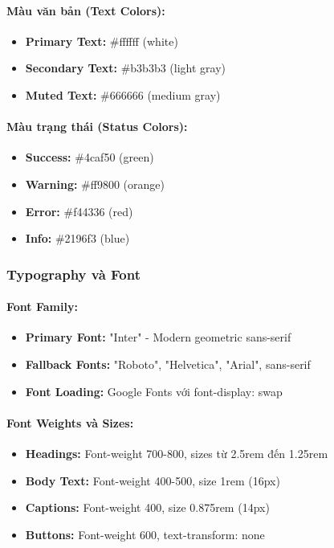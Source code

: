 \paragraph{Màu văn bản (Text Colors):}
\begin{itemize}
    \item \textbf{Primary Text:} \#ffffff (white)
    \item \textbf{Secondary Text:} \#b3b3b3 (light gray)
    \item \textbf{Muted Text:} \#666666 (medium gray)
\end{itemize}

\paragraph{Màu trạng thái (Status Colors):}
\begin{itemize}
    \item \textbf{Success:} \#4caf50 (green)
    \item \textbf{Warning:} \#ff9800 (orange)
    \item \textbf{Error:} \#f44336 (red)
    \item \textbf{Info:} \#2196f3 (blue)
\end{itemize}

\subsubsection{Typography và Font}

\paragraph{Font Family:}
\begin{itemize}
    \item \textbf{Primary Font:} "Inter" - Modern geometric sans-serif
    \item \textbf{Fallback Fonts:} "Roboto", "Helvetica", "Arial", sans-serif
    \item \textbf{Font Loading:} Google Fonts với font-display: swap
\end{itemize}

\paragraph{Font Weights và Sizes:}
\begin{itemize}
    \item \textbf{Headings:} Font-weight 700-800, sizes từ 2.5rem đến 1.25rem
    \item \textbf{Body Text:} Font-weight 400-500, size 1rem (16px)
    \item \textbf{Captions:} Font-weight 400, size 0.875rem (14px)
    \item \textbf{Buttons:} Font-weight 600, text-transform: none
\end{itemize}

